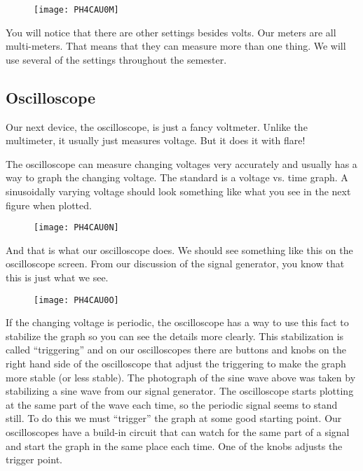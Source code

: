 \begin{figure}[h!]
   \centering
   \texttt{[image: PH4CAU0M]}
\end{figure}

You will notice that there are other settings besides volts. Our meters are all multi-meters. That means that they can measure more than one thing. We will use several of the settings throughout the semester.

\subsection{Oscilloscope}

Our next device, the oscilloscope, is just a fancy voltmeter. Unlike the multimeter, it usually just measures voltage. But it does it with flare!

The oscilloscope can measure changing voltages very accurately and usually has a way to graph the changing voltage. The standard is a voltage vs. time graph. A sinusoidally varying voltage should look something like what you see in the next figure when plotted. 

\begin{figure}[h!]
	\centering
    \texttt{[image: PH4CAU0N]}
\end{figure}

And that is what our oscilloscope does. We should see something like this on the oscilloscope screen. From our discussion of the signal generator, you know that this is just what we see.

\begin{figure}[h!]
	\centering
    \texttt{[image: PH4CAU0O]}
\end{figure}

If the changing voltage is periodic, the oscilloscope has a way to use this fact to stabilize the graph so you can see the details more clearly. This stabilization is called ``triggering'' and on our oscilloscopes there are buttons and knobs on the right hand side of the oscilloscope that adjust the triggering to make the graph more stable (or less stable). The photograph of the sine wave above was taken by stabilizing a sine wave from our signal generator. The oscilloscope starts plotting at the same part of the wave each time, so the periodic signal seems to stand still. To do this we must ``trigger'' the graph at some good starting point. Our oscilloscopes have a build-in circuit that can watch for the same part of a signal and start the graph in the same place each time. One of the knobs adjusts the trigger point. 


